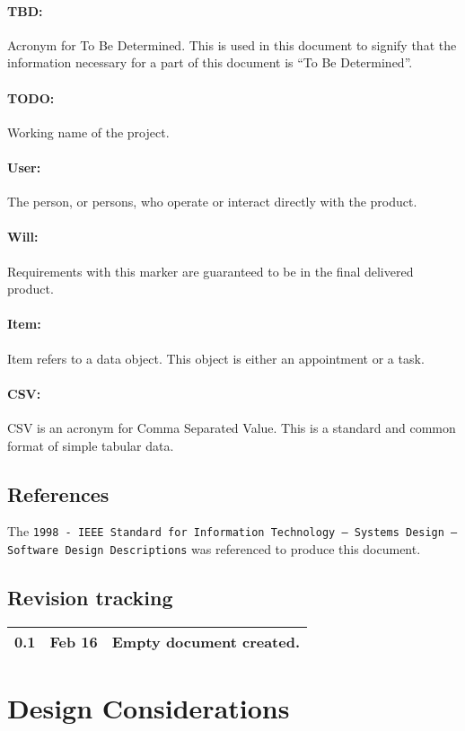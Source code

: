 \documentclass[12pt]{article}
\begin{document}
\paragraph{TBD:} Acronym for To Be Determined. This is used in this document to signify that the information necessary for a part of this document is ``To Be Determined''.
\paragraph{TODO:} Working name of the project.
\paragraph{User:} The person, or persons, who operate or interact directly with the product.
\paragraph{Will:} Requirements with this marker are guaranteed to be in the final delivered product.
\paragraph{Item:} Item refers to a data object. This object is either an appointment or a task.
\paragraph{CSV:} CSV is an acronym for Comma Separated Value. This is a standard and common format of simple tabular data.

\subsection{References}
The {\tt 1998 - IEEE Standard for Information Technology -- Systems Design -- Software Design Descriptions} was referenced to produce this document.

\subsection{Revision tracking}
\begin{tabular}{|l|r|p{4.6in}|}
\hline
0.1 & Feb 16 & Empty document created.\\
\hline
\end{tabular}

\section{Design Considerations}
\end{document}
